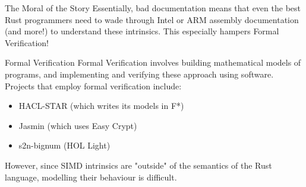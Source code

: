 \documentclass[presentation]{beamer}
\begin{document}
\begin{frame}[label={sec:org9e8e23d}]{The Moral of the Story}
Essentially, bad documentation means that even the best Rust programmers need to wade through Intel or ARM assembly documentation (and more!) to understand these intrinsics. \pause This especially hampers \alert{Formal Verification!}
\end{frame}
\begin{frame}[label={sec:orgaca167e}]{Formal Verification}
Formal Verification involves building mathematical models of programs, and implementing and verifying these approach using software. \pause Projects that employ formal verification include:
\begin{itemize}
\item HACL-STAR (which writes its models in F*)
\item Jasmin (which uses Easy Crypt)
\item s2n-bignum (HOL Light)
\end{itemize}
\pause However, since SIMD intrinsics are "outside" of the semantics of the Rust language, modelling their behaviour is difficult.
\end{frame}
\end{document}
